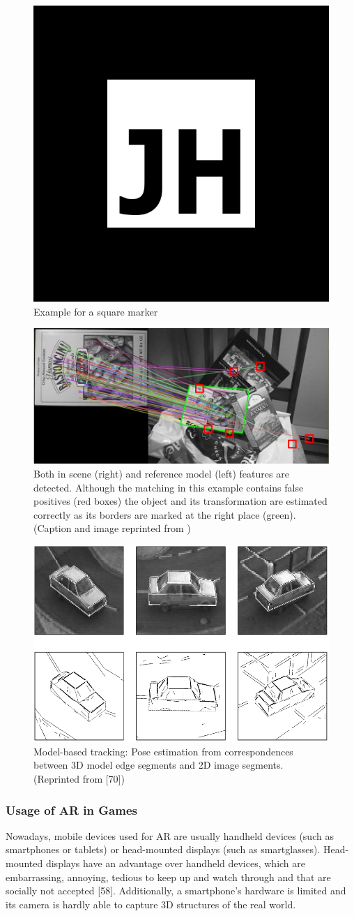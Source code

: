 \begin{figure}[bth]
  \centering
        \includegraphics[width=.2\linewidth]{gfx/jh_marker}
        \caption{Example for a square marker}
        \label{fig:marker}
\end{figure}
\begin{figure}[bth]
  \centering
        \includegraphics[width=.45\linewidth]{gfx/nft_tracking_reprint}
        \caption{Both in scene (right) and reference model (left) features are detected. Although the matching in this
example contains false positives (red boxes) the object and its transformation are estimated correctly
as its borders are marked at the right place (green). (Caption and image reprinted from \citep{hock2014augmented})}
        \label{fig:nft-tracking}
\end{figure}
\begin{figure}[bth]
  \centering
        \includegraphics[width=.45\linewidth]{gfx/model_based_tracking_reprint}
        \caption{Model-based tracking: Pose estimation from correspondences between 3D model edge segments and 2D image segments. (Reprinted from [70])}
        \label{fig:model-based-tracking}
\end{figure}

\subsubsection{Usage of AR in Games}
Nowadays, mobile devices used for AR are usually handheld devices (such as smartphones or tablets) or head-mounted displays (such as smartglasses). Head-mounted displays have an advantage over handheld devices, which are embarrassing, annoying, tedious to keep up and watch through and that are socially not accepted [58]. Additionally, a smartphone’s hardware is limited and its camera is hardly able to capture 3D structures of the real world.

